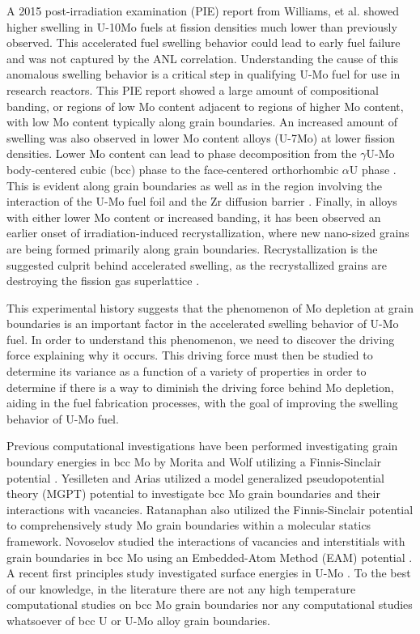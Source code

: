 \documentclass[review]{elsarticle}
\begin{document}
A 2015 post-irradiation examination (PIE) report \cite{afip6report} from Williams, et al. showed higher swelling in U-10Mo fuels at fission densities much lower than previously observed. This accelerated fuel swelling behavior could lead to early fuel failure and was not captured by the ANL correlation. Understanding the cause of this anomalous swelling behavior is a critical step in qualifying U-Mo fuel for use in research reactors. This PIE report showed a large amount of compositional banding, or regions of low Mo content adjacent to regions of higher Mo content, with low Mo content typically along grain boundaries. An increased amount of swelling was also observed in lower Mo content alloys (U-7Mo) \cite{vandenberghe2014} at lower fission densities. Lower Mo content can lead to phase decomposition from the $\gamma$U-Mo body-centered cubic (bcc) phase to the face-centered orthorhombic $\alpha$U phase \cite{janfong2014}. This is evident along grain boundaries as well as in the region involving the interaction of the U-Mo fuel foil and the Zr diffusion barrier \cite{park2015}. Finally, in alloys with either lower Mo content or increased banding, it has been observed an earlier onset of irradiation-induced recrystallization\cite{kim2013A}, where new nano-sized grains are being formed primarily along grain boundaries. Recrystallization is the suggested culprit behind accelerated swelling, as the recrystallized grains are destroying the fission gas superlattice \cite{vandenberghe2008}. 

This experimental history suggests that the phenomenon of Mo depletion at grain boundaries is an important factor in the accelerated swelling behavior of U-Mo fuel. In order to understand this phenomenon, we need to discover the driving force explaining why it occurs. This driving force must then be studied to determine its variance as a function of a variety of properties in order to determine if there is a way to diminish the driving force behind Mo depletion, aiding in the fuel fabrication processes, with the goal of improving the swelling behavior of U-Mo fuel.

Previous computational investigations have been performed investigating grain boundary energies in bcc Mo by Morita \cite{morita1997} and Wolf \cite{wolf1989bcc1, wolf1990bcc2} utilizing a Finnis-Sinclair potential \cite{finnis}. Yesilleten and Arias \cite{yesilleten2001} utilized a model generalized pseudopotential theory (MGPT) \cite{moriarty1988} potential to investigate bcc Mo grain boundaries and their interactions with vacancies. Ratanaphan \cite{ratanaphan2015} also utilized the Finnis-Sinclair potential \cite{finnis} to comprehensively study Mo grain boundaries within a molecular statics framework. Novoselov \cite{novoselov2014} studied the interactions of vacancies and interstitials with grain boundaries in bcc Mo using an Embedded-Atom Method (EAM) \cite{daw1984, daw1993} potential \cite{starikov2011}. A recent first principles study investigated surface energies in U-Mo \cite{zhigang2018}. To the best of our knowledge, in the literature there are not any high temperature computational studies on bcc Mo grain boundaries nor any computational studies whatsoever of bcc U or U-Mo alloy grain boundaries.
\end{document}
